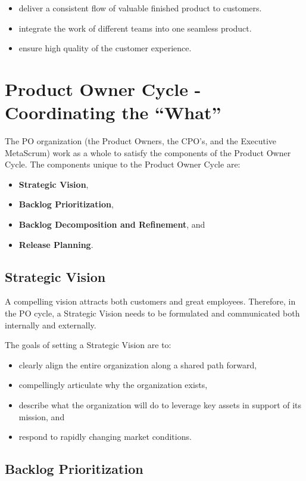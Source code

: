 \documentclass[12pt,a4paper,parskip=full]{scrartcl}
\begin{document}
\begin{itemize}
	\item deliver a consistent flow of valuable finished product to customers.
	\item integrate the work of different teams into one seamless product.
	\item ensure high quality of the customer experience.
\end{itemize}

\section{Product Owner Cycle - Coordinating the ``What''}

The PO organization (the Product Owners, the CPO's, and the Executive MetaScrum) work as a whole to satisfy the components of the Product Owner Cycle. The components unique to the Product Owner Cycle are:
\begin{itemize}
	\item \textbf{Strategic Vision},
	\item \textbf{Backlog Prioritization},
	\item \textbf{Backlog Decomposition and Refinement}, and
	\item \textbf{Release Planning}.
\end{itemize}

\subsection{Strategic Vision}

A compelling vision attracts both customers and great employees.
Therefore, in the PO cycle, a Strategic Vision needs to be formulated and communicated both internally and externally.

The goals of setting a Strategic Vision are to:

\begin{itemize}
	\item clearly align the entire organization along a shared path forward,
	\item compellingly articulate why the organization exists,
	\item describe what the organization will do to leverage key assets in support of its mission, and
	\item respond to rapidly changing market conditions.
\end{itemize}

\subsection{Backlog Prioritization}
\end{document}
